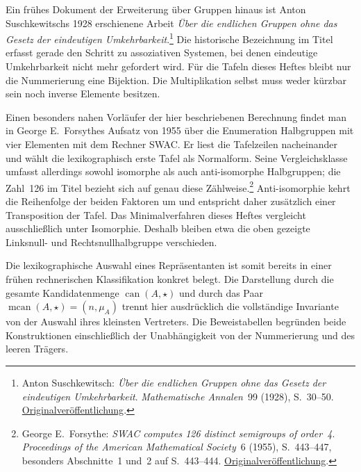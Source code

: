 Ein frühes Dokument der Erweiterung über Gruppen hinaus ist Anton
Suschkewitschs 1928 erschienene Arbeit \emph{Über die endlichen Gruppen
ohne das Gesetz der eindeutigen Umkehrbarkeit}.\footnote{%
Anton Suschkewitsch: \emph{Über die endlichen Gruppen ohne das Gesetz
der eindeutigen Umkehrbarkeit}. \emph{Mathematische Annalen}~99 (1928),
S.~30--50.
\href{https://doi.org/10.1007/BF01459084}{Originalveröffentlichung}.}
Die historische Bezeichnung im Titel erfasst gerade den Schritt zu
assoziativen Systemen, bei denen eindeutige Umkehrbarkeit nicht mehr
gefordert wird. Für die Tafeln dieses Heftes bleibt nur die Nummerierung
eine Bijektion. Die Multiplikation selbst muss weder kürzbar sein noch
inverse Elemente besitzen.

Einen besonders nahen Vorläufer der hier beschriebenen Berechnung
findet man in George E.~Forsythes Aufsatz von 1955 über die Enumeration
Halbgruppen mit vier Elementen mit dem Rechner SWAC. Er liest die
Tafelzeilen nacheinander und wählt die lexikographisch erste Tafel als
Normalform. Seine Vergleichsklasse umfasst allerdings sowohl
isomorphe als auch anti-isomorphe Halbgruppen; die Zahl~126 im Titel
bezieht sich auf genau diese Zählweise.\footnote{%
George E.~Forsythe: \emph{SWAC computes 126 distinct semigroups of order~4}.
\emph{Proceedings of the American Mathematical Society}~6 (1955),
S.~443--447, besonders Abschnitte~1 und~2 auf S.~443--444.
\href{https://doi.org/10.1090/S0002-9939-1955-0069814-7}{Originalveröffentlichung}.}
Anti-isomorphie kehrt die Reihenfolge der beiden Faktoren um und
entspricht daher zusätzlich einer Transposition der Tafel.
Das Minimalverfahren dieses Heftes vergleicht ausschließlich unter
Isomorphie. Deshalb bleiben etwa die oben gezeigte Linksnull- und
Rechtsnullhalbgruppe verschieden.

Die lexikographische Auswahl eines Repräsentanten ist somit bereits
in einer frühen rechnerischen Klassifikation konkret belegt. Die
Darstellung durch die gesamte Kandidatenmenge
\(\operatorname{can}(A,\star)\) und durch das Paar
\(\operatorname{mcan}(A,\star)=(n,\mu_A)\) trennt hier ausdrücklich
die vollständige Invariante von der Auswahl ihres kleinsten Vertreters.
Die Beweistabellen begründen beide Konstruktionen einschließlich
der Unabhängigkeit von der Nummerierung und des leeren Trägers.

\medskip
\noindent\TableIsomorphismsMainLink{}
\enspace\textperiodcentered\enspace
\TableIsomorphismsProofsLink{}
